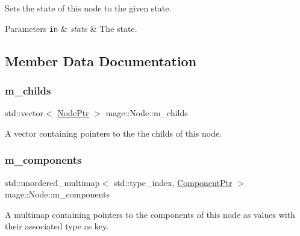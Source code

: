 Sets the state of this node to the given state.


\begin{DoxyParams}[1]{Parameters}
\mbox{\tt in}  & {\em state} & The state. \\
\hline
\end{DoxyParams}


\subsection{Member Data Documentation}
\mbox{\label{classmage_1_1_node_a1d1d432f46c61932b5167d27d20cc383}} 
\subsubsection{\texorpdfstring{m\+\_\+childs}{m\_childs}}
{\footnotesize\ttfamily std\+::vector$<$ \mbox{\hyperlink{classmage_1_1_node_ac575dc006e0ae1134277ade977dc06b6}{Node\+Ptr}} $>$ mage\+::\+Node\+::m\+\_\+childs\hspace{0.3cm}{\ttfamily [private]}}

A vector containing pointers to the the childs of this node. \mbox{\label{classmage_1_1_node_a804d53398f193b6b06f883131ab7415d}} 
\subsubsection{\texorpdfstring{m\+\_\+components}{m\_components}}
{\footnotesize\ttfamily std\+::unordered\+\_\+multimap$<$ std\+::type\+\_\+index, \mbox{\hyperlink{classmage_1_1_node_a46b7e1f4f5b98bfa78ed96a80797a4ba}{Component\+Ptr}} $>$ mage\+::\+Node\+::m\+\_\+components\hspace{0.3cm}{\ttfamily [private]}}

A multimap containing pointers to the components of this node as values with their associated type as key. \mbox{\label{classmage_1_1_node_a3ef1876293074bfcc01104eb92f1bfdf}} 
